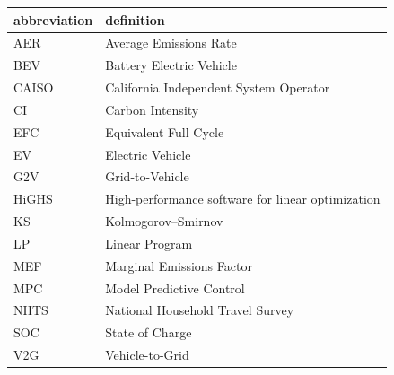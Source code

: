 \begin{tabular}{ll}
\toprule
abbreviation & definition \\
\midrule
AER & Average Emissions Rate \\
BEV & Battery Electric Vehicle \\
CAISO & California Independent System Operator \\
CI & Carbon Intensity \\
EFC & Equivalent Full Cycle \\
EV & Electric Vehicle \\
G2V & Grid-to-Vehicle \\
HiGHS & High-performance software for linear optimization \\
KS & Kolmogorov–Smirnov \\
LP & Linear Program \\
MEF & Marginal Emissions Factor \\
MPC & Model Predictive Control \\
NHTS & National Household Travel Survey \\
SOC & State of Charge \\
V2G & Vehicle-to-Grid \\
\bottomrule
\end{tabular}
